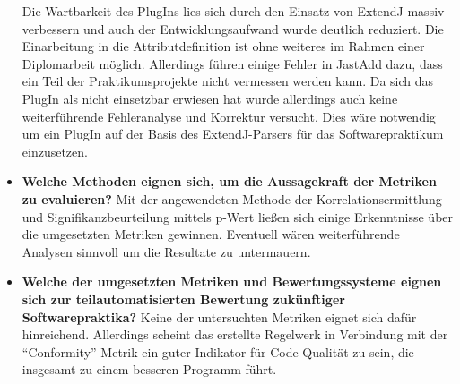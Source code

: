 \documentclass[da,ngerman]{stthesis}
\begin{document}
\begin{itemize}
				Die Wartbarkeit des PlugIns lies sich durch den Einsatz von ExtendJ massiv verbessern und auch der Entwicklungsaufwand wurde deutlich reduziert. Die Einarbeitung in die Attributdefinition ist ohne weiteres im Rahmen einer Diplomarbeit möglich. Allerdings führen einige Fehler in JastAdd dazu, dass ein Teil der Praktikumsprojekte nicht vermessen werden kann. Da sich das PlugIn als nicht einsetzbar erwiesen hat wurde allerdings auch keine weiterführende Fehleranalyse und Korrektur versucht. Dies wäre notwendig um ein PlugIn auf der Basis des ExtendJ-Parsers für das Softwarepraktikum einzusetzen.
				\item \textbf{Welche Methoden eignen sich, um die Aussagekraft der Metriken zu evaluieren?} \newline \newline
				Mit der angewendeten Methode der Korrelationsermittlung und Signifikanzbeurteilung mittels p-Wert ließen sich einige Erkenntnisse über die umgesetzten Metriken gewinnen. Eventuell wären weiterführende Analysen sinnvoll um die Resultate zu untermauern.
				\item \textbf{Welche der umgesetzten Metriken und Bewertungssysteme eignen sich zur teilautomatisierten Bewertung zukünftiger Softwarepraktika?} \newline \newline
				Keine der untersuchten Metriken eignet sich dafür hinreichend. Allerdings scheint das erstellte Regelwerk in Verbindung mit der "`Conformity"'-Metrik ein guter Indikator für Code-Qualität zu sein, die insgesamt zu einem besseren Programm führt.
			\end{itemize}
\end{document}
